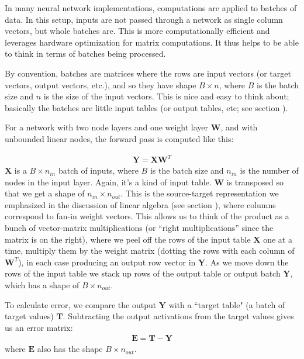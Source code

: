 In many neural network implementations, computations are applied to batches of data. In this setup, inputs are not passed through a network as single column vectors, but whole batches are. This is more computationally efficient and leverages hardware optimization for matrix computations.  It thus helps to be able to think in terms of batches being processed.

By convention, batches are matrices where the rows are input vectors (or target vectors, output vectors, etc.), and so they have shape $B \times n$, where $B$ is the batch size and $n$ is the size of the input vectors. This is nice and easy to think about; basically the batches are little input tables (or output tables, etc; see section ).


For a network with two node layers and one weight layer $\mathbf{W}$, and with unbounded linear nodes, the forward pass is computed like this:

\begin{eqnarray}
\mathbf{Y} = \mathbf{X} \mathbf{W}^T
\end{eqnarray}
$\mathbf{X}$ is a  $B \times n_{in}$ batch of inputs, where $B$ is the batch size and $n_{in}$ is the number of nodes in the input layer. Again, it's a kind of input table. $\mathbf{W}$ is transposed so that we get a shape of $n_{in} \times n_{out}$. This is the source-target representation we emphasized in the discussion of linear algebra (see section ), where columns correspond to fan-in weight vectors. This allows us to think of the product as a bunch of vector-matrix multiplications (or ``right multiplications'' since the matrix is on the right), where we peel off the rows of the input table $\mathbf{X}$ one at a time, multiply them by the weight matrix (dotting the rows with each column of $\mathbf{W}^T$), in each case producing an output row vector in $\mathbf{Y}$. As we move down the rows of the input table we stack up rows of the output table or output batch $\mathbf{Y}$, which has a shape of $B \times n_{out}$.

To calculate error, we compare the output $\mathbf{Y}$ with a ``target table" (a batch of target values) $\mathbf{T}$. Subtracting the output activations from the target values  gives us an error matrix:
\begin{eqnarray}
\mathbf{E} = \mathbf{T} - \mathbf{Y}
\end{eqnarray}
where $\mathbf{E}$ also has the shape $B \times n_{out}$.

